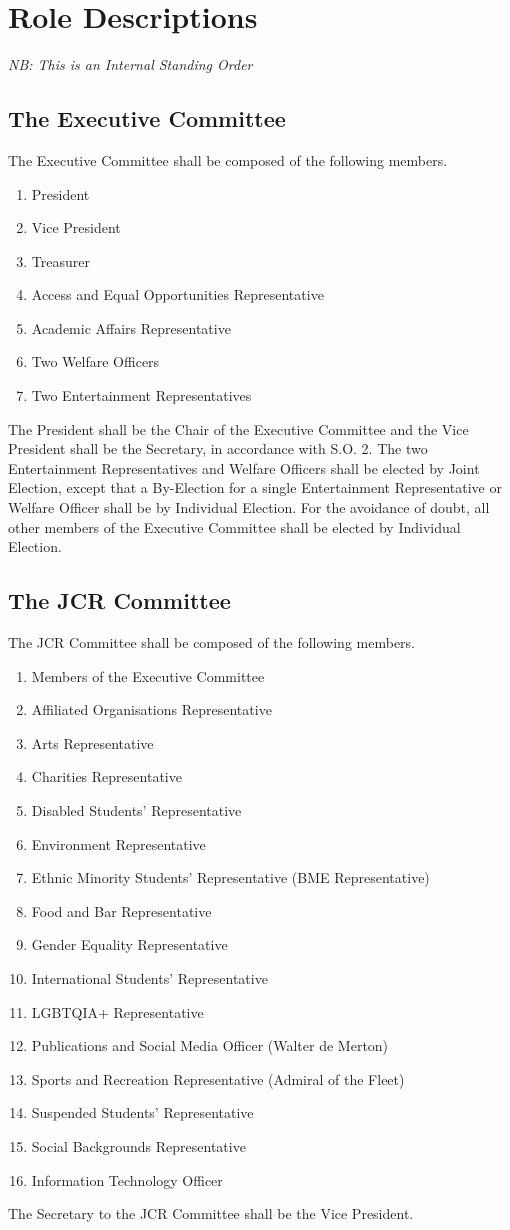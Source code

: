 \chapter{Role Descriptions}
\textit{NB: This is an Internal Standing Order}
\section{The Executive Committee}
\npara The Executive Committee shall be composed of the following members.
\begin{enumerate}
	\item President
	\item Vice President
	\item Treasurer
	\item Access and Equal Opportunities Representative
	\item Academic Affairs Representative
	\item Two Welfare Officers
	\item Two Entertainment Representatives
\end{enumerate}
\npara The President shall be the Chair of the Executive Committee and the Vice President shall be the Secretary, in accordance with S.O. 2.
\npara The two Entertainment Representatives and Welfare Officers shall be elected by Joint Election, except that a By-Election for a single Entertainment Representative or Welfare Officer shall be by Individual Election. For the avoidance of doubt, all other members of the Executive Committee shall be elected by Individual Election. 
\section{The JCR Committee}
\npara The JCR Committee shall be composed of the following members.
\begin{enumerate}
	\item Members of the Executive Committee
	\item Affiliated Organisations Representative
	\item Arts Representative
	\item Charities Representative
	\item Disabled Students' Representative
	\item Environment Representative
	\item Ethnic Minority Students' Representative (BME Representative)
	\item Food and Bar Representative
	\item Gender Equality Representative
	\item International Students' Representative
	\item LGBTQIA+ Representative
	\item Publications and Social Media Officer (Walter de Merton)
	\item Sports and Recreation Representative (Admiral of the Fleet)
	\item Suspended Students' Representative
	\item Social Backgrounds Representative
	\item Information Technology Officer
\end{enumerate}
\npara The Secretary to the JCR Committee shall be the Vice President.
